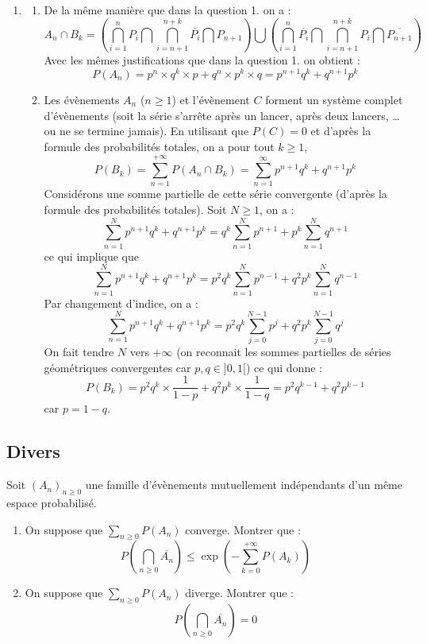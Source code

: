 \documentclass[a4paper,twoside,french,10pt]{VcCours}
\begin{document}
\begin{enumerate}
\item 
\begin{enumerate}
\item De la même manière que dans la question 1. on a :
\[ A_n \cap B_k = \left( \bigcap_{i=1}^n P_i \bigcap \bigcap_{i=n+1}^{n+k} \overline{P_i} \bigcap P_{n+1} \right) \bigcup \left( \bigcap_{i=1}^n \overline{P_i} \bigcap \bigcap_{i=n+1}^{n+k} P_i \bigcap \overline{P_{n+1}} \right) \]
Avec les mêmes justifications que dans la question 1. on obtient :
\[ P(A_n) = p^n \times q^k \times p + q^n \times p^k \times q = p^{n+1} q^k + q^{n+1} p^k \]
\item Les évènements $A_n$ ($n \geq 1$) et l'évènement $C$ forment un système complet d'évènements (soit la série s'arrête après un lancer, après deux lancers, \ldots ou ne se termine jamais). En utilisant que $P(C)=0$ et d'après la formule des probabilités totales, on a pour tout $k \geq 1$,
\[ P(B_k) = \sum_{n=1}^{+ \infty} P(A_n \cap B_k) = \sum_{n=1}^{\infty} p^{n+1} q^k + q^{n+1} p^k \]
Considérons une somme partielle de cette série convergente (d'après la formule des probabilités totales). Soit $N \geq 1$, on a :
\[ \sum_{n=1}^N p^{n+1} q^k +q^{n+1} p^k = q^k \sum_{n=1}^N p^{n+1} + p^k \sum_{n=1}^N q^{n+1} \]
ce qui implique que 
\[ \sum_{n=1}^N p^{n+1} q^k +q^{n+1} p^k = p^2 q^k \sum_{n=1}^N p^{n-1} + q^2p^k \sum_{n=1}^N q^{n-1} \]
Par changement d'indice, on a :
\[ \sum_{n=1}^N p^{n+1} q^k +q^{n+1} p^k = p^2 q^k \sum_{j=0}^{N-1} p^{j} + q^2p^k \sum_{j=0}^{N-1} q^{j} \]
On fait tendre $N$ vers $+\infty$ (on reconnait les sommes partielles de séries géométriques convergentes car $p,q \in ]0,1[$) ce qui donne :
\[ P(B_k) = p^2 q^k \times \frac{1}{1-p} + q^2 p^k \times \frac{1}{1-q} = p^2 q^{k-1} + q^2 p^{k-1} \]
car $p=1-q$.
\end{enumerate}
\end{enumerate}



\subsection{Divers}




\begin{Exercice}{} Soit $(A_n)_{n \geq 0}$ une famille d'évènements mutuellement indépendants d'un même espace probabilisé.
\begin{enumerate}
\item On suppose que $\sum_{n \geq 0} P(A_n)$ converge. Montrer que :
$$ P \left( \bigcap_{n \geq 0} \overline{A_n} \right) \leq \exp \left(- \sum_{k=0}^{+ \infty} P(A_k) \right)$$
\item On suppose que $\sum_{n \geq 0} P(A_n)$ diverge. Montrer que :
$$ P \left( \bigcap_{n \geq 0} \overline{A_n} \right) = 0$$
\end{enumerate}
\end{Exercice}
\end{document}
